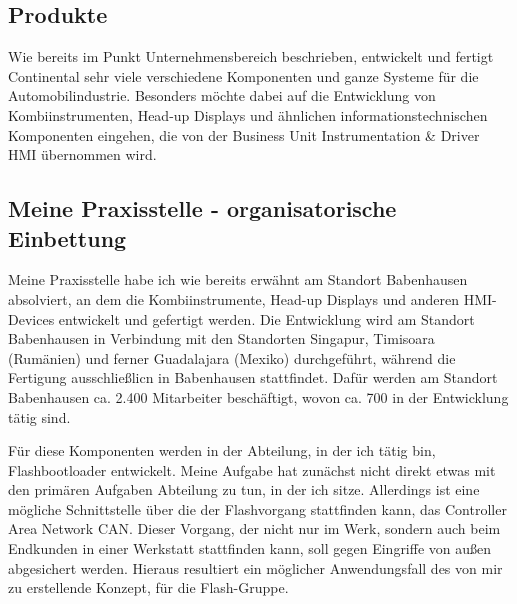 \subsection{Produkte}

Wie bereits im Punkt Unternehmensbereich beschrieben, entwickelt und fertigt Continental sehr viele verschiedene Komponenten und ganze Systeme für die Automobilindustrie. 
Besonders möchte dabei auf die Entwicklung von Kombiinstrumenten, Head-up Displays und ähnlichen informationstechnischen Komponenten eingehen, die von der Business Unit Instrumentation \& Driver HMI übernommen wird. 





\subsection{Meine Praxisstelle - organisatorische Einbettung} %


Meine Praxisstelle habe ich wie bereits erwähnt am Standort Babenhausen absolviert, an dem die Kombiinstrumente, Head-up Displays und anderen HMI-Devices  entwickelt und gefertigt werden. 
Die Entwicklung wird am Standort Babenhausen in Verbindung mit den Standorten Singapur, Timisoara (Rumänien) und ferner Guadalajara (Mexiko) durchgeführt,  während die Fertigung ausschließlicn in Babenhausen stattfindet.
Dafür werden am Standort Babenhausen ca. 2.400 Mitarbeiter beschäftigt, wovon ca. 700 in der Entwicklung tätig sind. 

Für diese Komponenten werden in der Abteilung, in der ich tätig bin, Flashbootloader entwickelt. 
Meine Aufgabe hat zunächst nicht direkt etwas mit den primären Aufgaben Abteilung zu tun, in der ich sitze. Allerdings ist eine mögliche Schnittstelle über die der Flashvorgang stattfinden kann, das Controller Area Network CAN. Dieser Vorgang, der nicht nur im Werk, sondern auch beim Endkunden in einer Werkstatt stattfinden kann, soll gegen Eingriffe von außen abgesichert werden. Hieraus resultiert ein möglicher Anwendungsfall des von mir zu erstellende Konzept, für die Flash-Gruppe. 

